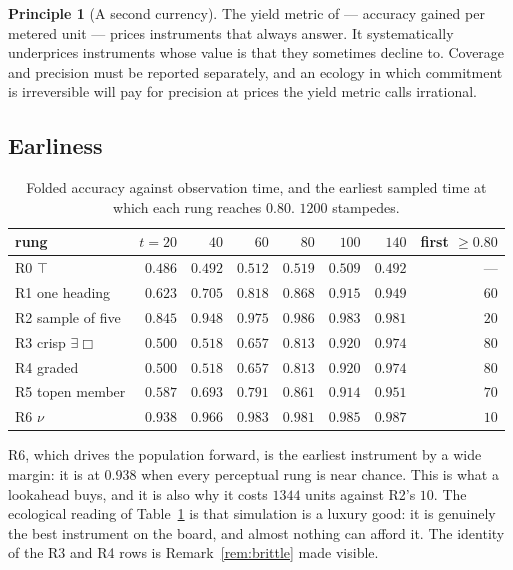 \documentclass[11pt,a4paper]{article}
\theoremstyle{plain}
\theoremstyle{definition}
\newtheorem{principle}[theorem]{Principle}
\theoremstyle{remark}
\newcommand{\Ebox}{\exists\Box}
\begin{document}
\begin{principle}[A second currency]\label{prin:currency}
The yield metric of \cite{game} --- accuracy gained per metered unit --- prices
instruments that always answer. It systematically underprices instruments whose
value is that they sometimes decline to. Coverage and precision must be
reported separately, and an ecology in which commitment is irreversible will
pay for precision at prices the yield metric calls irrational.
\end{principle}

\subsection{Earliness}

\begin{table}[t]
\centering
\begin{tabular}{@{}lrrrrrrr@{}}
\toprule
rung & $t{=}20$ & $40$ & $60$ & $80$ & $100$ & $140$ & first $\ge 0.80$\\
\midrule
R0 $\top$          & $0.486$ & $0.492$ & $0.512$ & $0.519$ & $0.509$ & $0.492$ & ---\\
R1 one heading     & $0.623$ & $0.705$ & $0.818$ & $0.868$ & $0.915$ & $0.949$ & $60$\\
R2 sample of five  & $0.845$ & $0.948$ & $0.975$ & $0.986$ & $0.983$ & $0.981$ & $20$\\
R3 crisp $\Ebox$   & $0.500$ & $0.518$ & $0.657$ & $0.813$ & $0.920$ & $0.974$ & $80$\\
R4 graded          & $0.500$ & $0.518$ & $0.657$ & $0.813$ & $0.920$ & $0.974$ & $80$\\
R5 topen member    & $0.587$ & $0.693$ & $0.791$ & $0.861$ & $0.914$ & $0.951$ & $70$\\
R6 $\nu$           & $0.938$ & $0.966$ & $0.983$ & $0.981$ & $0.985$ & $0.987$ & $10$\\
\bottomrule
\end{tabular}
\caption{Folded accuracy against observation time, and the earliest sampled time
at which each rung reaches $0.80$. $1200$ stampedes.}
\label{tab:early}
\end{table}

R6, which drives the population forward, is the earliest instrument by a wide
margin: it is at $0.938$ when every perceptual rung is near chance. This is what
a lookahead buys, and it is also why it costs $1344$ units against R2's $10$.
The ecological reading of Table~\ref{tab:early} is that simulation is a
luxury good: it is genuinely the best instrument on the board, and almost
nothing can afford it. The identity of the R3 and R4 rows is
Remark~\ref{rem:brittle} made visible.
\end{document}
